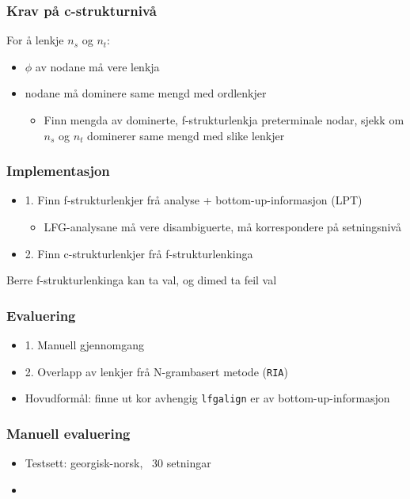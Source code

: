 \documentclass[bigger]{beamer}
\begin{document}
\begin{frame}\frametitle{Krav på c-strukturnivå}
  For å lenkje $n_s$ og $n_t$:
  \begin{itemize}
  \item $\phi$ av nodane må vere lenkja
  \item nodane må dominere same mengd med ordlenkjer
    \begin{itemize}
    \item Finn mengda av dominerte, f-strukturlenkja preterminale
      nodar, sjekk om $n_s$ og $n_t$ dominerer same mengd med slike
      lenkjer
    \end{itemize}
  \end{itemize}
\end{frame}


\begin{frame}\frametitle{Implementasjon}
  \begin{itemize}
  \item 1. Finn f-strukturlenkjer frå analyse + bottom-up-informasjon (LPT)
    \begin{itemize}
    \item LFG-analysane må vere disambiguerte, må korrespondere på setningsnivå 
    \end{itemize}
  \item 2. Finn c-strukturlenkjer frå f-strukturlenkinga
  \end{itemize}

  Berre f-strukturlenkinga kan ta val, og dimed ta feil val
\end{frame}


\begin{frame}\frametitle{Evaluering}
  \begin{itemize}
  \item 1. Manuell gjennomgang
  \item 2. Overlapp av lenkjer frå N-grambasert metode (\texttt{RIA})
  \item Hovudformål: finne ut kor avhengig \texttt{lfgalign} er av
    bottom-up-informasjon
  \end{itemize}
\end{frame}

\begin{frame}\frametitle{Manuell evaluering}
  \begin{itemize}
  \item Testsett: georgisk-norsk, ~30 setningar
  \item 
  \end{itemize}
\end{frame}
\end{document}
